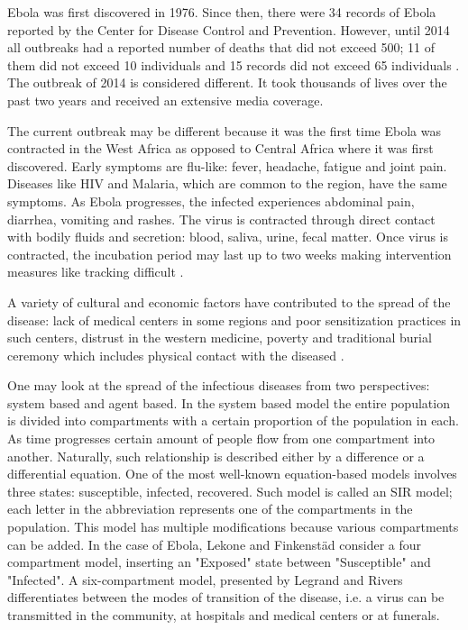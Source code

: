\documentclass[10pt]{article}
\begin{document}
Ebola was first discovered in 1976. Since then, there were 34 records of Ebola reported by the Center for Disease Control and Prevention. However, until 2014 all outbreaks had a reported number of deaths that did not exceed 500; 11 of them did not exceed 10 individuals and 15 records did not exceed 65 individuals \cite{CDCOutbreaks}.  The outbreak of 2014 is considered different. It took thousands of lives over the past two years and received an extensive media coverage.

The current outbreak may be different because it was the first time Ebola was contracted in the West Africa as opposed to Central Africa where it was first discovered. Early symptoms are flu-like: fever, headache, fatigue and joint pain. Diseases like HIV and Malaria, which are common to the region, have the same symptoms. As Ebola progresses, the infected experiences abdominal pain, diarrhea, vomiting and rashes. The virus is contracted through direct contact with bodily fluids and secretion: blood, saliva, urine, fecal matter. Once virus is contracted, the incubation period may last up to two weeks making intervention measures like tracking difficult \cite{CDCSympt}. 

A variety of cultural and economic factors have contributed to the spread of the disease: lack of medical centers in some regions and poor sensitization practices in such centers, distrust in the western medicine, poverty and traditional burial ceremony which includes physical contact with the diseased \cite{WHOReasons}. 

One may look at the spread of the infectious diseases from two perspectives: system based and agent based. In the system based model the entire population is divided into compartments with a certain proportion of the population in each. As time progresses certain amount of people flow from one compartment into another. Naturally, such relationship is described either by a difference or a differential equation. One of the most well-known equation-based models involves three states: susceptible, infected, recovered. Such model is called an SIR model; each letter in the abbreviation represents one of the compartments in the population. This model has multiple modifications because various compartments can be added. In the case of Ebola, Lekone and Finkenstäd \cite{Lekone2006} consider a four compartment model, inserting an "Exposed" state between "Susceptible" and "Infected". A six-compartment model, presented by Legrand \cite{Legrand2007} and Rivers\cite{Rivers2014} differentiates between the modes of transition of the disease, i.e. a virus can be transmitted in the community, at hospitals and medical centers or at funerals.
\end{document}
